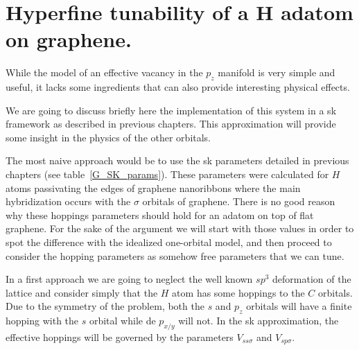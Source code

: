 \chapter{Hyperfine tunability of a H adatom on graphene.}
While the model of an effective vacancy in the $p_z$ manifold is very simple and useful, it lacks some ingredients that can also provide interesting physical effects.

We are going to discuss briefly here the implementation of this system in a \ac{sk} framework as described in previous chapters. This approximation will provide some insight in the physics of the other orbitals.


The most naive approach would be to use the \ac{sk} parameters detailed in previous chapters (see table~\ref{G_SK_params}). These parameters were calculated for $H$ atoms passivating the edges of graphene nanoribbons\cite{Gosalbez-Martinez2011} where the main hybridization occurs with the $\sigma$ orbitals of graphene. There is no good reason why these hoppings parameters should hold for an adatom on top of flat graphene. For the sake of the argument we will start with those values in order to spot the difference with the idealized one-orbital model, and then proceed to consider the hopping parameters as somehow free parameters that we can tune.


In a first approach we are going to neglect the well known $sp^3$ deformation of the lattice\cite{} and consider simply that the $H$ atom has some hoppings to the $C$ orbitals. Due to the symmetry of the problem, both the $s$ and $p_z$ orbitals will have a finite hopping with the $s$ orbital while de $p_{x/y}$ will not. In the \ac{sk} approximation, the effective hoppings will be governed by the parameters $V_{ss\sigma}$ and $V_{sp\sigma}$.


